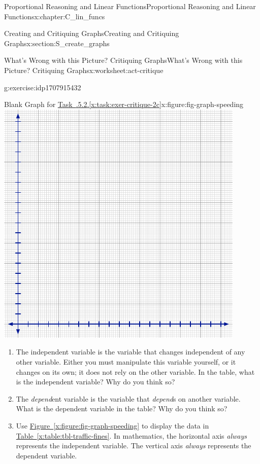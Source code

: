 \documentclass[oneside,10pt,]{book}
\newcommand{\xreffont}{\relax}
\numberwithin{equation}{chapter}
\begin{document}
\begin{chapterptx}{Proportional Reasoning and Linear Functions}{}{Proportional Reasoning and Linear Functions}{}{}{x:chapter:C_lin_funcs}
\begin{sectionptx}{Creating and Critiquing Graphs}{}{Creating and Critiquing Graphs}{}{}{x:section:S_create_graphs}
\begin{worksheet-subsection}{What's Wrong with this Picture? Critiquing Graphs}{}{What's Wrong with this Picture? Critiquing Graphs}{}{}{x:worksheet:act-critique}
\begin{divisionexercise}{2}{}{}{g:exercise:idp1707915432}
\begin{sidebyside}{2}{0}{0}{0}
\begin{sbspanel}{0.5}
\begin{figureptx}{Blank Graph for \hyperref[x:task:exer-critique-2c]{Task~{\xreffont 2.2.5.2}.{\xreffont\ref{x:task:exer-critique-2c}}}}{x:figure:fig-graph-speeding}{}
\includegraphics[width=\linewidth]{external/blank-graph.pdf}
\tcblower
\end{figureptx}%
\end{sbspanel}%
\end{sidebyside}%
\begin{enumerate}[font=\bfseries,label=(\alph*),ref=\alph*]
\item{}The independent variable is the variable that changes independent of any other variable. Either you must manipulate this variable yourself, or it changes on its own; it does not rely on the other variable. In the table, what is the independent variable? Why do you think so?%
\item{}The \emph{depend}ent variable is the variable that \emph{depend}s on another variable. What is the dependent variable in the table? Why do you think so?%
\item\label{x:task:exer-critique-2c}Use \hyperref[x:figure:fig-graph-speeding]{Figure~{\xreffont\ref{x:figure:fig-graph-speeding}}} to display the data in \hyperref[x:table:tbl-traffic-fines]{Table~{\xreffont\ref{x:table:tbl-traffic-fines}}}. In mathematics, the horizontal axis \emph{always} represents the independent variable. The vertical axis \emph{always} represents the dependent variable.%
\end{enumerate}
\end{divisionexercise}%

\end{worksheet-subsection}
\end{sectionptx}
\end{chapterptx}
\end{document}

